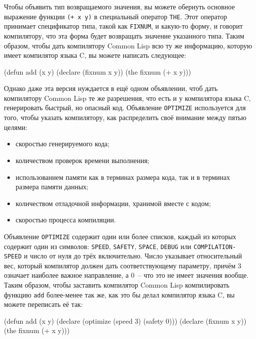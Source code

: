 Чтобы объявить тип возвращаемого значения, вы можете обернуть основное выражение функции
\lstinline{(+ x y)} в специальный оператор \lstinline{THE}. Этот оператор принимает спецификатор
типа, такой как \lstinline{FIXNUM}, и какую-то форму, и говорит компилятору, что эта форма
будет возвращать значение указанного типа. Таким образом, чтобы дать компилятору Common
Lisp всю ту же информацию, которую имеет компилятор языка C, вы можете написать следующее:

\begin{myverb}
(defun add (x y)
  (declare (fixnum x y))
  (the fixnum (+ x y)))
\end{myverb}

Однако даже эта версия нуждается в ещё одном объявлении, чтоб дать компилятору Common Lisp
те же разрешения, что есть и у компилятора языка C, генерировать быстрый, но опасный
код. Объявление \lstinline{OPTIMIZE} используется для того, чтобы указать компилятору, как
распределить своё внимание между пятью целями:

\begin{itemize}
\item скоростью генерируемого кода;
\item количеством проверок времени выполнения;
\item использованием памяти как в терминах размера кода, так и в терминах размера памяти
  данных;
\item количеством отладочной информации, хранимой вместе с кодом;
\item скоростью процесса компиляции.
\end{itemize}

Объявление \lstinline{OPTIMIZE} содержит один или более списков, каждый из которых содержит
один из символов: \lstinline{SPEED}, \lstinline{SAFETY}, \lstinline{SPACE}, \lstinline{DEBUG} или
\lstinline{COMPILATION-SPEED} и число от нуля до трёх включительно. Число указывает
относительный вес, который компилятор должен дать соответствующему параметру, причём 3
означает наиболее важное направление, а 0~-- что это не имеет значения вообще. Таким
образом, чтобы заставить компилятор Common Lisp компилировать функцию \lstinline{add}
более-менее так же, как это бы делал компилятор языка C, вы можете переписать её так:

\begin{myverb}
(defun add (x y)
  (declare (optimize (speed 3) (safety 0)))
  (declare (fixnum x y))
  (the fixnum (+ x y)))
\end{myverb}

